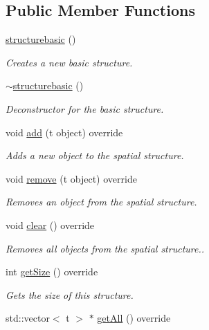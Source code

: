 \subsection*{Public Member Functions}
\begin{DoxyCompactItemize}
\item 
\hyperlink{classflounder_1_1structurebasic_a4cdb10b77f632a140476bfd33da7cdd7}{structurebasic} ()
\begin{DoxyCompactList}\small\item\em Creates a new basic structure. \end{DoxyCompactList}\item 
\hyperlink{classflounder_1_1structurebasic_a7ce24fc6a91e6a340d8526cc84b2f8ae}{$\sim$structurebasic} ()
\begin{DoxyCompactList}\small\item\em Deconstructor for the basic structure. \end{DoxyCompactList}\item 
void \hyperlink{classflounder_1_1structurebasic_a75d3685a3341fcaef9e28deaf1f2dcd2}{add} (t object) override
\begin{DoxyCompactList}\small\item\em Adds a new object to the spatial structure. \end{DoxyCompactList}\item 
void \hyperlink{classflounder_1_1structurebasic_a30ae1add25079e6bed1709b72d1d89e2}{remove} (t object) override
\begin{DoxyCompactList}\small\item\em Removes an object from the spatial structure. \end{DoxyCompactList}\item 
void \hyperlink{classflounder_1_1structurebasic_a080579359485a5b32489a004c70da095}{clear} () override
\begin{DoxyCompactList}\small\item\em Removes all objects from the spatial structure.. \end{DoxyCompactList}\item 
int \hyperlink{classflounder_1_1structurebasic_aaef414a91ef6bd96982b1f7c10ae31b2}{get\+Size} () override
\begin{DoxyCompactList}\small\item\em Gets the size of this structure. \end{DoxyCompactList}\item 
std\+::vector$<$ t $>$ $\ast$ \hyperlink{classflounder_1_1structurebasic_a77aa32807b5d3b901a6184cf6af81073}{get\+All} () override

\end{DoxyCompactItemize}
